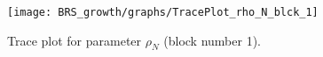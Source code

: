 \begin{figure}[H]
\centering
  \texttt{[image: BRS\_growth/graphs/TracePlot\_rho\_N\_blck\_1]}\\
    \caption{Trace plot for parameter ${\rho_N}$ (block number 1).}
\end{figure}
